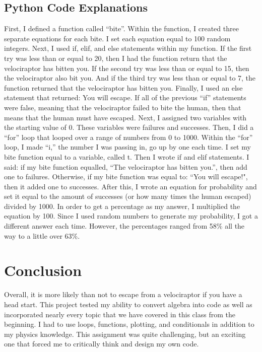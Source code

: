 \documentclass[twocolumn]{revtex4}
\begin{document}
\subsection{Python Code Explanations}
First, I defined a function called ``bite''. Within the function, I created three separate equations for each bite. I set each equation equal to 100 random integers. Next, I used if, elif, and else statements within my function. If the first try was less than or equal to 20, then I had the function return that the velociraptor has bitten you. If the second try was less than or equal to 15, then the velociraptor also bit you. And if the third try was less than or equal to 7, the function returned that the velociraptor has bitten you. Finally, I used an else statement that returned: You will escape. If all of the previous ``if'' statements were false, meaning that the velociraptor failed to bite the human, then that means that the human must have escaped. Next, I assigned two variables with the starting value of 0. These variables were failures and successes. Then, I did a ``for'' loop that looped over a range of numbers from 0 to 1000. Within the ``for'' loop, I made ``i,'' the number I was passing in, go up by one each time. I set my bite function equal to a variable, called t. Then I wrote if and elif statements. I said: if my bite function equalled, ``The velociraptor has bitten you.'', then add one to failures. Otherwise, if my bite function was equal to: ``You will escape!", then it added one to successes. After this, I wrote an equation for probability and set it equal to the amount of successes (or how many times the human escaped) divided by 1000. In order to get a percentage as my answer, I multiplied the equation by 100. Since I used random numbers to generate my probability, I got a different answer each time. However, the percentages ranged from 58\% all the way to a little over 63\%.



\section{Conclusion}

Overall, it is more likely than not to escape from a velociraptor if you have a head start. This project tested my ability to convert algebra into code as well as incorporated nearly every topic that we have covered in this class from the beginning. I had to use loops, functions, plotting, and conditionals in addition to my physics knowledge. This assignment was quite challenging, but an exciting one that forced me to critically think and design my own code. 

\end{document}
